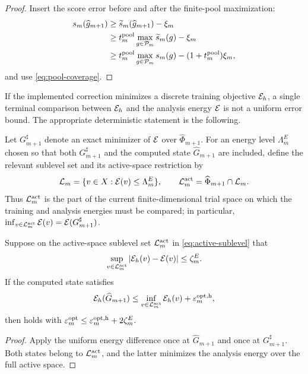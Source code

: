 \begin{proof}
Insert the score error before and after the finite-pool maximization:
\begin{align*}
s_m(\widehat g_{m+1})
&\geq\widetilde s_m(\widehat g_{m+1})-\xi_m\\
&\geq t_m^{\rm pool}\max_{g\in\mathcal{P}_m}\widetilde s_m(g)-\xi_m\\
&\geq t_m^{\rm pool}\max_{g\in\mathcal{P}_m}s_m(g)
 -(1+t_m^{\rm pool})\xi_m,
\end{align*}
and use \cref{eq:pool-coverage}.
\end{proof}

If the implemented correction minimizes a discrete training objective $\mathcal{E}_h$, a single terminal comparison
between $\mathcal{E}_h$ and the analysis energy $\mathcal{E}$ is not a uniform error bound. The appropriate deterministic statement is
the following.

Let \(G_{m+1}^{\sharp}\) denote an exact minimizer of \(\mathcal{E}\) over
\(\widehat\Phi_{m+1}\). For an energy level \(\Lambda_m^E\) chosen so that both
\(G_{m+1}^{\sharp}\) and the computed state \(\widehat G_{m+1}\) are included, define the relevant sublevel
set and its active-space restriction by
\begin{equation}
 \mathcal L_m=\{v\in X:\mathcal{E}(v)\leq\Lambda_m^E\},
 \qquad \mathcal L_m^{\rm act}=\widehat\Phi_{m+1}\cap\mathcal L_m.
 \label{eq:active-sublevel}
\end{equation}
Thus \(\mathcal L_m^{\rm act}\) is the part of the current finite-dimensional trial space on which the
training and analysis energies must be compared; in particular,
\(\inf_{v\in\mathcal L_m^{\rm act}}\mathcal{E}(v)=\mathcal{E}(G_{m+1}^{\sharp})\).

\begin{lemma}
\label{lem:energy-transfer}
Suppose on the active-space sublevel set \(\mathcal L_m^{\rm act}\) in
\cref{eq:active-sublevel} that
\[
 \sup_{v\in\mathcal L_m^{\rm act}}
 \left\lvert \mathcal{E}_h(v)-\mathcal{E}(v)\right\rvert\leq\zeta_m^E.
\]
If the computed state satisfies
\[
 \mathcal{E}_h(\widehat G_{m+1})\leq
 \inf_{v\in\mathcal L_m^{\rm act}}\mathcal{E}_h(v)+\varepsilon_m^{\rm opt,h},
\]
then  holds with
\(\varepsilon_m^{\rm opt}\leq\varepsilon_m^{\rm opt,h}+2\zeta_m^E\).
\end{lemma}

\begin{proof}
Apply the uniform energy difference once at \(\widehat G_{m+1}\) and once at
\(G_{m+1}^{\sharp}\). Both states belong to \(\mathcal L_m^{\rm act}\), and the latter minimizes the analysis
energy over the full active space.
\end{proof}
